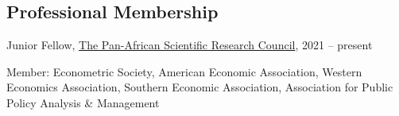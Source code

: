 \documentclass[12pt,letterpaper]{article}
\renewenvironment{itemize}{
	\begin{list}{}{
			\setlength{\leftmargin}{1em}
			\setlength{\itemsep}{0.15em}
			\setlength{\parskip}{0pt}
			\setlength{\parsep}{0.2em}
		}
	}{
	\end{list}
}
\begin{document}
\subsection*{Professional Membership}
\begin{itemize}
	\item Junior Fellow,  \href{https://africanschoolofeconomics.com/news/pasrc-announces-inaugural-members/}{The Pan-African Scientific Research Council}, 2021 -- present 
	\item Member: Econometric Society, American Economic Association, Western Economics Association, Southern Economic Association, Association for Public Policy Analysis \& Management
\end{itemize}




\iffalse 
\end{document}
